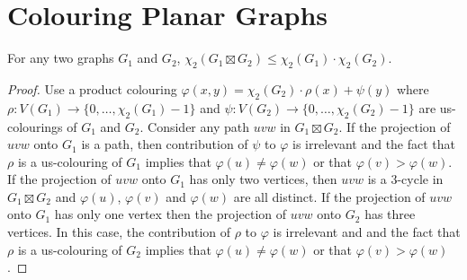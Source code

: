 \documentclass[kpfonts]{patmorin}
\newcommand{\uqs}{\chi_2}
\theoremstyle{named}
\begin{document}
%
%
%
%
%
%

\section{Colouring Planar Graphs}

\begin{lem}\label{product-lemma}
    For any two graphs $G_1$ and $G_2$, $\uqs(G_1\boxtimes G_2)\le \uqs(G_1)\cdot\uqs(G_2)$.
\end{lem}

\begin{proof}
  Use a product colouring $\varphi(x,y)=\uqs(G_2)\cdot \rho(x) + \psi(y)$ where $\rho:V(G_1)\to\{0,\ldots,\uqs(G_1)-1\}$ and $\psi:V(G_2)\to\{0,\ldots,\uqs(G_2)-1\}$ are us-colourings of $G_1$ and $G_2$.  Consider any path $uvw$ in $G_1\boxtimes G_2$.  If the projection of $uvw$ onto $G_1$ is a path, then contribution of $\psi$ to $\varphi$ is irrelevant and the fact that $\rho$ is a us-colouring of $G_1$ implies that $\varphi(u)\neq \varphi(w)$ or that $\varphi(v)>\varphi(w)$.  If the projection of $uvw$ onto $G_1$ has only two vertices, then $uvw$ is a $3$-cycle in $G_1\boxtimes G_2$ and $\varphi(u)$, $\varphi(v)$ and $\varphi(w)$ are all distinct.  If the projection of $uvw$ onto $G_1$ has only one vertex then the projection of $uvw$ onto $G_2$ has three vertices.  In this case, the contribution of $\rho$ to $\varphi$ is irrelevant and  and the fact that $\rho$ is a us-colouring of $G_2$ implies that $\varphi(u)\neq \varphi(w)$ or that $\varphi(v)>\varphi(w)$.
\end{proof}
\end{document}
